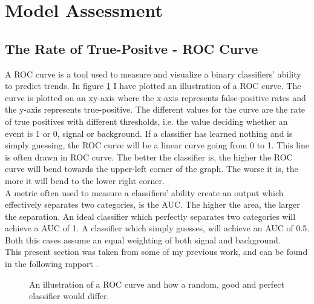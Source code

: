 \section{Model Assessment}\label{subsec:Cost}
\subsection{The Rate of True-Positve - ROC Curve}\label{subsec:AUC}
A \ac{ROC} curve is a tool used to measure and visualize a binary classifiers' ability 
to predict trends. In figure \ref{fig:ROC} I have plotted an illustration of a \ac{ROC} curve.
The curve is plotted on an xy-axis where the x-axis represents 
false-positive rates and the y-axis represents true-positive. The different values 
for the curve are the rate of true positives with different thresholds, i.e. 
the value deciding whether an event is 1 or 0, signal or background. If a classifier 
has learned nothing and is simply guessing, the \ac{ROC} curve will be a linear curve 
going from 0 to 1. This line is often drawn in \ac{ROC} curve. The better the 
classifier is, the higher the \ac{ROC} curve will bend towards the upper-left corner of the 
graph. The worse it is, the more it will bend to the lower right corner. 
\\
A metric often used to measure a classifiers' ability create an output which effectively 
separates two categories, is the \ac{AUC}. The higher the area, the larger the separation. 
An ideal classifier which perfectly separates two categories will achieve a \ac{AUC} of 1.
A classifier which simply guesses, will achieve an \ac{AUC} of 0.5. Both this cases assume 
an equal weighting of both signal and background. 
\\
This present section was taken from some of my previous work, and can be found in the following 
rapport \cite{HirstFretteML}.
\begin{figure}
    \centering
    \caption{An illustration of a \acs{ROC} curve and how a random, good and perfect classifier would differ.}
    \label{fig:ROC}
\end{figure}

